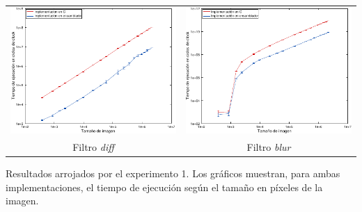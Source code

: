             \noindent{} \begin{minipage}{\textwidth}
                \begin{center}
                    \vspace{1em}
                    \begin{tabular}{cc}
                        \includegraphics{graficos/exp1-diff-c_vs_asm.pdf} & \includegraphics{graficos/exp1-blur-c_vs_asm.pdf} \\
                        {\small Filtro \emph{diff}}                       & {\small Filtro \emph{blur}}
                        \vspace{1em}
                    \end{tabular}
                    Resultados arrojados por el experimento 1. Los gráficos muestran, para ambas implementaciones, el tiempo de ejecución según el tamaño en píxeles de la imagen.
                \end{center}
            \end{minipage}

